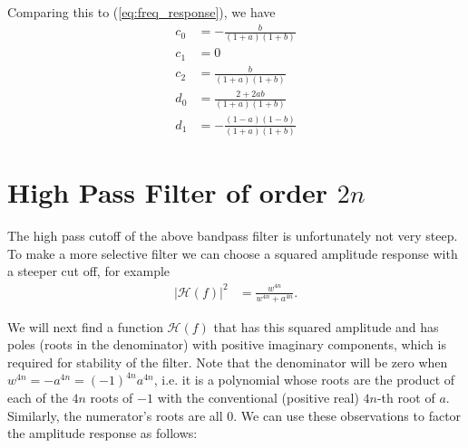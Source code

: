 \documentclass[a4paper]{article}
\begin{document}
Comparing this to (\ref{eq:freq_response}), we have
\begin{align}
c_0 &= -\frac{b}{(1 + a)(1 + b)} \label{eq:c0}\\
c_1 &= 0 \\
c_2 &= \frac{b}{(1 + a)(1 + b)} \\
d_0 &= \frac{2 +2ab}{(1 + a)(1 + b)} \\
d_1 &= -\frac{(1-a)(1-b)}{(1 + a)(1 + b)} \label{eq:d1}
\end{align}

\section{High Pass Filter of order $2 n$}
The high pass cutoff of the above bandpass filter is unfortunately not very
steep.  To make a more selective filter we can choose a squared
amplitude response with a steeper cut off, for example
\begin{align}
    |\mathcal{H}(f)|^2 &= \frac{w^{4n}}{w^{4n} + a^{4n}}.
\end{align}

We will next find a function $\mathcal{H}(f)$ that has this squared amplitude
and has poles (roots in the denominator) with positive imaginary components,
which is required for stability of the filter.
Note that the denominator will be zero when $w^{4n} = -a^{4n} = (-1)^{4n}
a^{4n}$, i.e. it is a polynomial whose roots are the product of each of the
$4n$ roots of $-1$ with the conventional (positive real) $4n$-th root of $a$.
Similarly, the numerator's roots are all $0$.  We can use these observations to
factor the amplitude response as follows:
\end{document}
